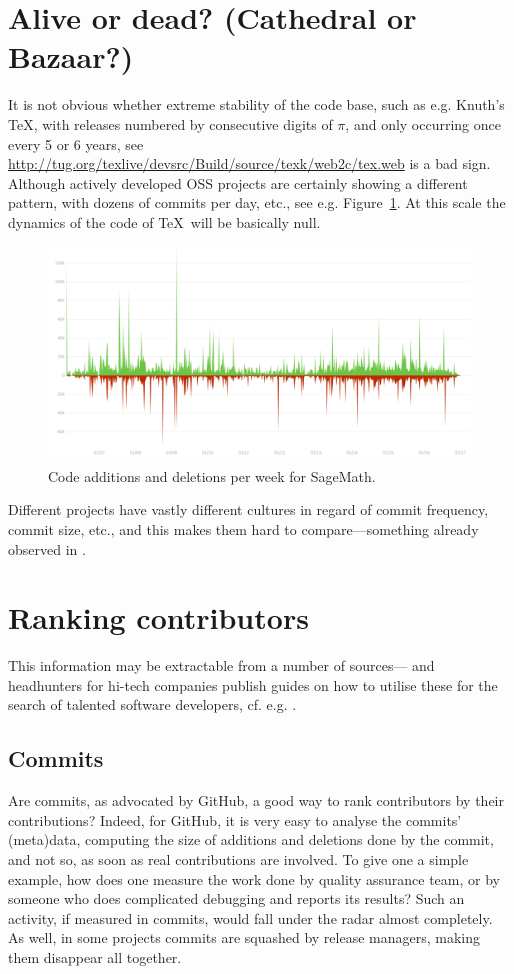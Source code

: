 \documentclass{deliverablereport}
\begin{document}
\section{Alive or dead? (Cathedral or Bazaar?)}
It is not obvious whether extreme stability of the code base,
such as e.g. Knuth's \TeX \cite{Knuth:ttb84}, with releases
numbered by consecutive digits of $\pi$, and only occurring
once every 5 or 6 years, see
\url{http://tug.org/texlive/devsrc/Build/source/texk/web2c/tex.web}
is a bad sign.
Although actively developed OSS projects are certainly showing 
a different pattern, with dozens of commits per day, etc., see
e.g. Figure~\ref{wp7:figsageadddel}. At this scale the dynamics of
the code of \TeX\ will be basically null.
\begin{figure}[ht]
  \includegraphics[width=\textwidth]{codeadddel}
    \caption{Code additions and deletions per week for 
    SageMath.\label{wp7:figsageadddel}}
\end{figure}
Different projects have vastly different cultures in regard of
commit frequency, commit size, etc., and this makes them 
hard to compare---something already observed in 
 \cite{raymond99:cathedral-bazaar}. 


\section{Ranking contributors}
This information may be extractable from a number of sources---
and headhunters for hi-tech companies publish guides on
how to utilise these for the search of talented software developers, cf.
e.g. \cite{wp7:sota}.

\subsection{Commits}
Are commits, as advocated by GitHub, a good way to rank contributors by their
contributions? Indeed, for GitHub, it is very easy to analyse the commits' (meta)data, computing the size of additions and deletions done by the commit,
and not so, as soon as real contributions are involved. To give one a simple example, how does
one measure the work done by quality assurance team, or by someone who does complicated debugging
and reports its results? Such an activity, if measured in commits, would fall under the radar almost
completely. As well, in some projects commits are squashed by release
managers, making them disappear all together.
\end{document}
